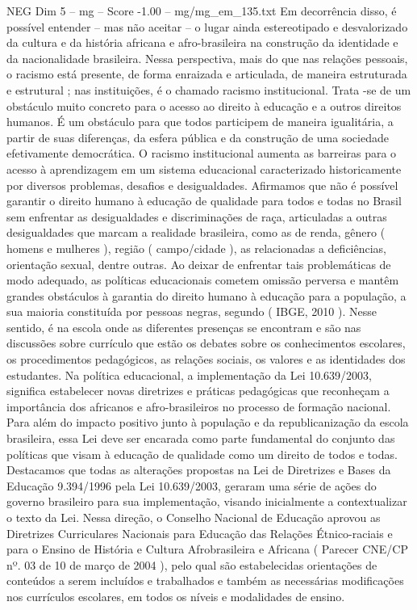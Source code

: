 \begin{textsample}{NEG Dim 5 – mg – Score -1.00 – mg/mg\_em\_135.txt}
Em decorrência disso, é possível entender – mas não aceitar – o lugar ainda estereotipado e desvalorizado da cultura e da história africana e afro-brasileira na construção da identidade e da nacionalidade brasileira.
Nessa perspectiva, mais do que nas relações pessoais, o racismo está presente, de forma enraizada e articulada, de maneira estruturada e estrutural ; nas instituições, é o chamado racismo institucional.
Trata -se de um obstáculo muito concreto para o acesso ao direito à educação e a outros direitos humanos.
É um obstáculo para que todos participem de maneira igualitária, a partir de suas diferenças, da esfera pública e da construção de uma sociedade efetivamente democrática.
O racismo institucional aumenta as barreiras para o acesso à aprendizagem em um sistema educacional caracterizado historicamente por diversos problemas, desafios e desigualdades.
Afirmamos que não é possível garantir o direito humano à educação de qualidade para todos e todas no Brasil sem enfrentar as desigualdades e discriminações de raça, articuladas a outras desigualdades que marcam a realidade brasileira, como as de renda, gênero ( homens e mulheres ), região ( campo/cidade ), as relacionadas a deficiências, orientação sexual, dentre outras.
Ao deixar de enfrentar tais problemáticas de modo adequado, as políticas educacionais cometem omissão perversa e mantêm grandes obstáculos à garantia do direito humano à educação para a população, a sua maioria constituída por pessoas negras, segundo ( IBGE, 2010 ).
Nesse sentido, é na escola onde as diferentes presenças se encontram e são nas discussões sobre currículo que estão os debates sobre os conhecimentos escolares, os procedimentos pedagógicos, as relações sociais, os valores e as identidades dos estudantes.
Na política educacional, a implementação da Lei 10.639/2003, significa estabelecer novas diretrizes e práticas pedagógicas que reconheçam a importância dos africanos e afro-brasileiros no processo de formação nacional.
Para além do impacto positivo junto à população e da republicanização da escola brasileira, essa Lei deve ser encarada como parte fundamental do conjunto das políticas que visam à educação de qualidade como um direito de todos e todas.
Destacamos que todas as alterações propostas na Lei de Diretrizes e Bases da Educação 9.394/1996 pela Lei 10.639/2003, geraram uma série de ações do governo brasileiro para sua implementação, visando inicialmente a contextualizar o texto da Lei.
Nessa direção, o Conselho Nacional de Educação aprovou as Diretrizes Curriculares Nacionais para Educação das Relações Étnico-raciais e para o Ensino de História e Cultura Afrobrasileira e Africana ( Parecer CNE/CP nº. 03 de 10 de março de 2004 ), pelo qual são estabelecidas orientações de conteúdos a serem incluídos e trabalhados e também as necessárias modificações nos currículos escolares, em todos os níveis e modalidades de ensino.

\end{textsample}
